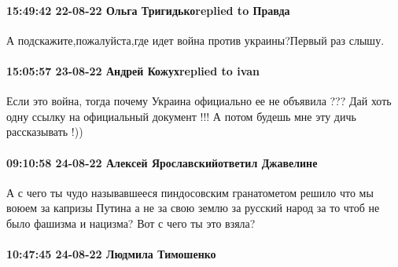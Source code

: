 \paragraph{15:49:42 22-08-22 Ольга Тригидькоreplied to Правда}

А подскажите,пожалуйста,где идет война против украины?Первый раз слышу.

\paragraph{15:05:57 23-08-22 Андрей Кожухreplied to ivan}

Если это война, тогда почему Украина официально ее не объявила ??? Дай хоть
одну ссылку на официальный документ !!!
А потом будешь мне эту дичь рассказывать !))

\paragraph{09:10:58 24-08-22 Алексей Ярославскийответил Джавелине}

А с чего ты чудо называвшееся пиндосовским гранатометом решило что мы воюем за
капризы Путина а не за свою землю за русский народ за то чтоб не было фашизма и
нацизма? Вот с чего ты это взяла?

\paragraph{10:47:45 24-08-22 Людмила Тимошенко}

